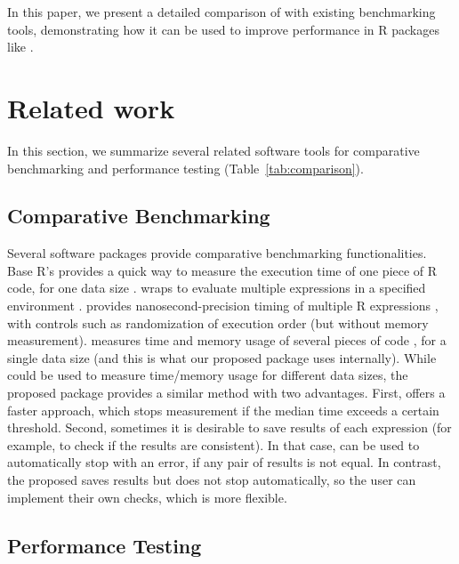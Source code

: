 In this paper, we present a detailed comparison of  with existing benchmarking tools, demonstrating how it can be used to improve performance in R packages like .


\section{Related work}
In this section, we summarize several related software tools for comparative benchmarking and performance testing
(Table~\ref{tab:comparison}).

\subsection{Comparative Benchmarking}

Several software packages provide comparative benchmarking functionalities.
Base R's  provides a quick way to measure the execution time of one piece of R code, for one data size \citep{baseR}. 
 wraps  to evaluate multiple expressions in a specified environment \citep{rbenchmark}.
 provides nanosecond-precision timing of multiple R expressions \citep{microbenchmark}, with controls such as randomization of execution order (but without memory measurement).
 measures time and memory usage of several pieces of code \citep{bench}, for a single data size (and this is what our proposed  package uses internally).
While  could be used to measure time/memory usage for different data sizes, the proposed  package provides a similar method with two advantages.
First,  offers a faster approach, which stops measurement if the median time exceeds a certain threshold. 
Second, sometimes it is desirable to save results of each expression (for example, to check if the results are consistent).
In that case,  can be used to automatically stop with an error, if any pair of results is not equal.
In contrast, the proposed  saves results but does not stop automatically, so the user can implement their own checks, which is more flexible.

\subsection{Performance Testing}

